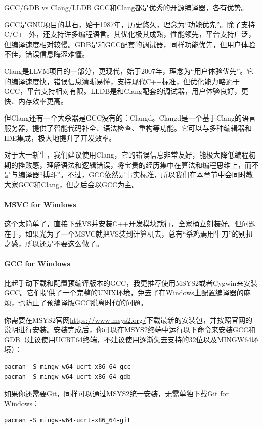 \begin{remark}{GCC/GDB vs Clang/LLDB}
    GCC和Clang都是优秀的开源编译器，各有优势。

    GCC是GNU项目的基石，始于1987年，历史悠久，理念为“功能优先”。除了支持C/C++外，还支持许多编程语言。其优化极其成熟，性能领先，平台支持广泛，但编译速度相对较慢。GDB是和GCC配套的调试器，同样功能优先，但用户体验不佳，错误信息晦涩难懂。
    
    Clang是LLVM项目的一部分，更现代，始于2007年，理念为“用户体验优先”。它的编译速度快，错误信息清晰易懂，支持现代C++标准，但优化能力略逊于GCC，平台支持相对有限。LLDB是和Clang配套的调试器，用户体验良好，更快、内存效率更高。

    但Clang还有一个大杀器是GCC没有的：Clangd。Clangd是一个基于Clang的语言服务器，提供了智能代码补全、语法检查、重构等功能。它可以与多种编辑器和IDE集成，极大地提升了开发效率。

    对于大一新生，我们建议使用Clang，它的错误信息非常友好，能极大降低编程初期的挫败感，理解语法和逻辑错误，将宝贵的经历集中在算法和编程思维上，而不是与编译器“搏斗”。不过，GCC依然是事实标准，所以我们在本章节中会同时教大家GCC和Clang，但之后会以GCC为主。
\end{remark}

\paragraph{MSVC for Windows} 这个太简单了，直接下载VS并安装C++开发模块就行，全家桶立刻装好。但问题在于，如果光为了一个MSVC就把VS装到计算机去，总有“杀鸡焉用牛刀”的别扭之感，所以还是不要这么做了。

\paragraph{GCC for Windows} 比起手动下载和配置预编译版本的GCC，我更推荐使用MSYS2或者Cygwin来安装GCC。它们提供了一个完整的UNIX环境，免去了在Windows上配置编译器的麻烦，也防止了预编译版GCC脱离时代的问题。

你需要在MSYS2官网\url{https://www.msys2.org/}下载最新的安装包，并按照官网的说明进行安装。安装完成后，你可以在MSYS2终端中运行以下命令来安装GCC和GDB（建议使用UCRT64终端，不建议使用逐渐失去支持的32位以及MINGW64环境）：

\begin{verbatim}
pacman -S mingw-w64-ucrt-x86_64-gcc
pacman -S mingw-w64-ucrt-x86_64-gdb
\end{verbatim}

如果你还需要Git，同样可以通过MSYS2统一安装，无需单独下载Git for Windows：
\begin{verbatim}
pacman -S mingw-w64-ucrt-x86_64-git
\end{verbatim}

